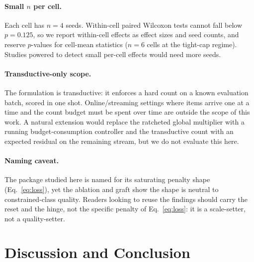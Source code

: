\documentclass[10pt]{article}
\begin{document}
\paragraph{Small $n$ per cell.}
Each cell has $n{=}4$ seeds. Within-cell paired Wilcoxon tests cannot
fall below $p{=}0.125$, so we report within-cell effects as effect sizes
and seed counts, and reserve $p$-values for cell-mean statistics ($n{=}6$
cells at the tight-cap regime). Studies powered to detect small
per-cell effects would need more seeds.

\paragraph{Transductive-only scope.}
The formulation is transductive: it enforces a hard count on a known
evaluation batch, scored in one shot. Online/streaming settings where
items arrive one at a time and the count budget must be spent over time
are outside the scope of this work. A natural extension would replace
the ratcheted global multiplier with a running budget-consumption
controller and the transductive count with an expected residual on the
remaining stream, but we do not evaluate this here.

\paragraph{Naming caveat.}
The package studied here is named for its saturating penalty shape
(Eq.~\eqref{eq:loss}), yet the ablation and graft show the shape is
neutral to constrained-class quality. Readers looking to reuse the
findings should carry the reset and the hinge, not the specific penalty
of Eq.~\eqref{eq:loss}: it is a scale-setter, not a quality-setter.

\section{Discussion and Conclusion}
\label{sec:conclusion}
\end{document}
